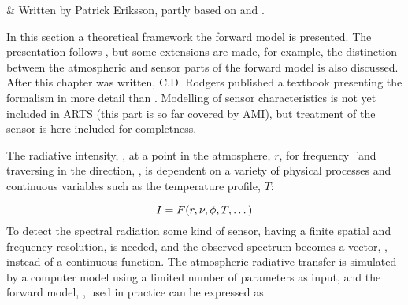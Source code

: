 %
%
 \label{sec:formalism}

%
%
 & Written by Patrick Eriksson, partly 
           based on \citet{eriksson:99} and \citet{eriksson:00a}. \\
\stophistory



%
%
In this section a theoretical framework the forward model is
presented. The presentation follows \citet{rodgers:90}, but some
extensions are made, for example, the distinction between the
atmospheric and sensor parts of the forward model is also discussed.
After this chapter was written, C.D. Rodgers published a textbook
\citep{rodgers:00} presenting the formalism in more detail than
\citet{rodgers:90}. Modelling of sensor characteristics is not yet
included in ARTS (this part is so far covered by AMI), but treatment
of the sensor is here included for completness.



 \label{sec:formalism:fm}
 
 The radiative intensity, \mpbi, at a point in the atmosphere, $r$, for
 frequency \f\ and traversing in the direction, \view, is dependent
 on a variety of physical processes and continuous variables such as
 the temperature profile, $T$:

 \begin{equation}
   I = F(r,\nu,\phi,T,\dots)
 \end{equation} 
 To detect the spectral radiation some kind of sensor, having a finite
 spatial and frequency resolution, is needed, and the observed
 spectrum becomes a vector, \y, instead of a continuous function.
 The atmospheric radiative transfer is simulated by a computer model
 using a limited number of parameters as input, and the forward model,
 \fm, used in practice can be expressed as
 
